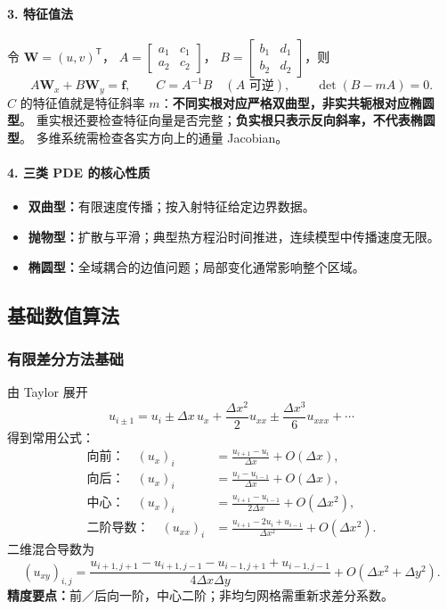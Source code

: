 \paragraph{3. 特征值法}
令 $\mathbf W=(u,v)^{\mathsf T}$，
$A=\begin{bmatrix}a_1&c_1\\a_2&c_2\end{bmatrix}$，
$B=\begin{bmatrix}b_1&d_1\\b_2&d_2\end{bmatrix}$，则
\[
 A\mathbf W_x+B\mathbf W_y=\mathbf f,\qquad
 C=A^{-1}B\quad(A\text{ 可逆}),\qquad \det(B-mA)=0.
\]
$C$ 的特征值就是特征斜率 $m$：\textbf{不同实根对应严格双曲型，非实共轭根对应椭圆型}。
重实根还要检查特征向量是否完整；\textbf{负实根只表示反向斜率，不代表椭圆型}。
多维系统需检查各实方向上的通量 Jacobian。

\paragraph{4. 三类 PDE 的核心性质}
\begin{itemize}
 \item \textbf{双曲型：}有限速度传播；按入射特征给定边界数据。
 \item \textbf{抛物型：}扩散与平滑；典型热方程沿时间推进，连续模型中传播速度无限。
 \item \textbf{椭圆型：}全域耦合的边值问题；局部变化通常影响整个区域。
\end{itemize}

\subsection{基础数值算法}
\label{sec:cfd-numerics}

\subsubsection{有限差分方法基础}
由 Taylor 展开
\[
 u_{i\pm1}=u_i\pm\Delta x\,u_x+\frac{\Delta x^2}{2}u_{xx}
            \pm\frac{\Delta x^3}{6}u_{xxx}+\cdots
\]
得到常用公式：
\begin{align*}
 \text{向前：}\quad (u_x)_i&=\frac{u_{i+1}-u_i}{\Delta x}+O(\Delta x),\\
 \text{向后：}\quad (u_x)_i&=\frac{u_i-u_{i-1}}{\Delta x}+O(\Delta x),\\
 \text{中心：}\quad (u_x)_i&=\frac{u_{i+1}-u_{i-1}}{2\Delta x}+O(\Delta x^2),\\
 \text{二阶导数：}\quad (u_{xx})_i&=
       \frac{u_{i+1}-2u_i+u_{i-1}}{\Delta x^2}+O(\Delta x^2).
\end{align*}
二维混合导数为
\[
 (u_{xy})_{i,j}=\frac{u_{i+1,j+1}-u_{i+1,j-1}-u_{i-1,j+1}+u_{i-1,j-1}}
 {4\Delta x\Delta y}+O(\Delta x^2+\Delta y^2).
\]
\textbf{精度要点：}前／后向一阶，中心二阶；非均匀网格需重新求差分系数。

